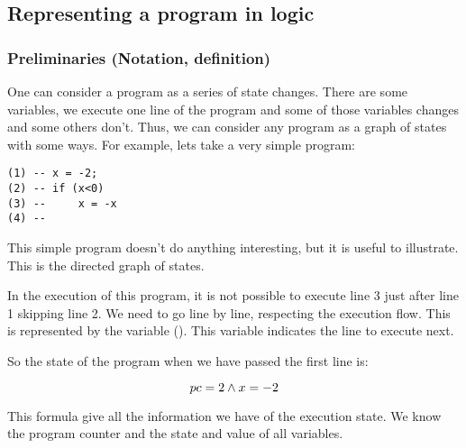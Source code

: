 \subsection{Representing a program in logic}

\subsubsection{Preliminaries (Notation, definition)}

One can consider a program as a series of state changes. There are some variables, we execute one line of the program and some of those variables changes and some others don't. Thus, we can consider any program as a graph of states with some ways. For example, lets take a very simple program:

\begin{lstlisting}
(1) -- x = -2;
(2) -- if (x<0) 
(3) --     x = -x 
(4) --
\end{lstlisting}

This simple program doesn't do anything interesting, but it is useful to illustrate. This is the directed graph of states.

\begin{center}
\end{center}

In the execution of this program, it is not possible to execute line 3 just after line 1 skipping line 2. We need to go line by line, respecting the execution flow. 
This is represented by the variable \pc (). This variable indicates the line to execute next.

So the state of the program when we have passed the first line is:

\[ pc = 2 \wedge x=-2\]

This formula give all the information we have of the execution state. We know the program counter and the state and value of all variables.

